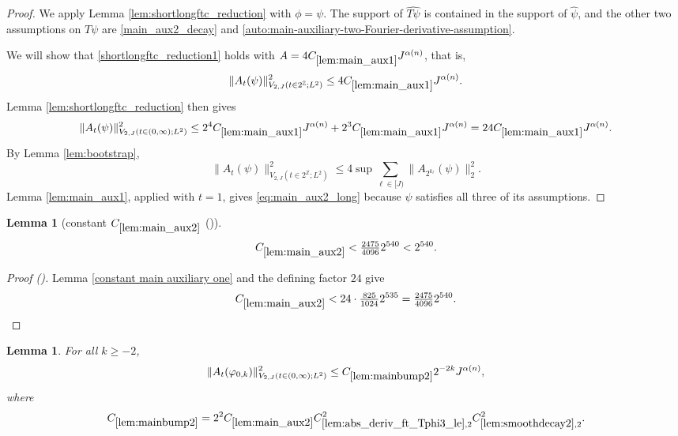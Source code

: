 \documentclass[12pt,reqno]{amsart}
\newcommand{\auto}{{({\tiny\faCar})}}
\theoremstyle{plain}
\newtheorem{lemma}[theorem]{Lemma}
\numberwithin{equation}{section}
\theoremstyle{remark}
\newcommand{\using}[1]{}
\newcommand{\Z}{{\mathbb Z}}
\begin{document}
\begin{proof}
We apply Lemma \ref{lem:shortlongftc_reduction} with $\phi=\psi$. The support of $\widehat{T\psi}$ is contained in the support of $\widehat\psi$, and the other two assumptions on $T\psi$ are \eqref{main_aux2_decay} and \eqref{auto:main-auxiliary-two-Fourier-derivative-assumption}.

We will show that \eqref{shortlongftc_reduction1} holds with $A=4C_{\ref{lem:main_aux1}}J^{\alpha(n)}$, that is,
\begin{equation}\label{eq:main_aux2_long}
\|A_t(\psi)\|^2_{V_{2,J}(t\in2^\Z;L^2)}
\le4C_{\ref{lem:main_aux1}}J^{\alpha(n)}.
\end{equation}
Lemma \ref{lem:shortlongftc_reduction} then gives
\[
\|A_t(\psi)\|_{V_{2,J}(t\in(0,\infty);L^2)}^2
\le2^4C_{\ref{lem:main_aux1}}J^{\alpha(n)}
+2^3C_{\ref{lem:main_aux1}}J^{\alpha(n)}
=24C_{\ref{lem:main_aux1}}J^{\alpha(n)}.
\]
By Lemma \ref{lem:bootstrap},
\[
\|A_t(\psi)\|^2_{V_{2,J}(t\in2^\Z;L^2)}
\le4\sup\sum_{\ell\in[J)}\|A_{2^{k_\ell}}(\psi)\|_2^2.
\]
Lemma \ref{lem:main_aux1}, applied with $t=1$, gives \eqref{eq:main_aux2_long} because $\psi$ satisfies all three of its assumptions.
\end{proof}

\begin{lemma}[constant $C_{\ref{lem:main_aux2}}$ \auto]\label{constant main auxiliary two}\using{constant main auxiliary one}\using{lem:main_aux2}
\begin{equation}\label{constant main auxiliary two bound}
C_{\ref{lem:main_aux2}}<\tfrac{2475}{4096}2^{540}<2^{540}.
\end{equation}
\end{lemma}
\begin{proof}[Proof \auto]
Lemma \ref{constant main auxiliary one} and the defining factor $24$ give
\[
C_{\ref{lem:main_aux2}}
<24\cdot\tfrac{825}{1024}2^{535}
=\tfrac{2475}{4096}2^{540}.
\]
\end{proof}

\begin{lemma}\label{lem:mainbump2}\using{lem:rescaling}\using{lem:main_aux2}\using{lem:abs_deriv_ft_Tphi3_le}\using{lem:smoothdecay2}\using{lem:ft_phi3_eq}\using{lem:abs_deriv_ft_phi3_le}\using{lem:ft_deriv_mul}
For all $k\ge-2$,
\begin{equation}\label{mainbump2}
\|A_t(\varphi_{0,k})\|_{V_{2,J}(t\in(0,\infty);L^2)}^2
\le C_{\ref{lem:mainbump2}}2^{-2k}J^{\alpha(n)},
\end{equation}
where
\begin{equation}\label{auto:main-bump-two-constant-definition}
C_{\ref{lem:mainbump2}}
=2^2C_{\ref{lem:main_aux2}}
C_{\ref{lem:abs_deriv_ft_Tphi3_le},2}^2
C_{\ref{lem:smoothdecay2},2}^2.
\end{equation}
\end{lemma}
\end{document}
